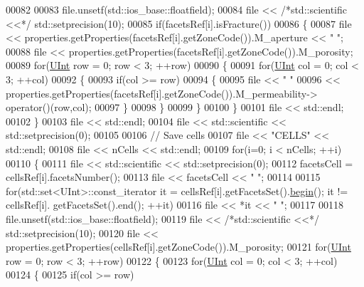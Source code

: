 \begin{DoxyCode}
00082 
00083         file.unsetf(std::ios\_base::floatfield);
00084         file << \textcolor{comment}{/*std::scientific <<*/} std::setprecision(10);
00085         \textcolor{keywordflow}{if}(facetsRef[i].isFracture())
00086         \{
00087             file << properties.getProperties(facetsRef[i].getZoneCode()).M\_aperture << \textcolor{stringliteral}{" "};
00088             file << properties.getProperties(facetsRef[i].getZoneCode()).M\_porosity;
00089             \textcolor{keywordflow}{for}(\hyperlink{namespaceFVCode3D_a4bf7e328c75d0fd504050d040ebe9eda}{UInt} row = 0; row < 3; ++row)
00090             \{
00091                 \textcolor{keywordflow}{for}(\hyperlink{namespaceFVCode3D_a4bf7e328c75d0fd504050d040ebe9eda}{UInt} col = 0; col < 3; ++col)
00092                 \{
00093                     \textcolor{keywordflow}{if}(col >= row)
00094                     \{
00095                         file << \textcolor{stringliteral}{" "}
00096                              << properties.getProperties(facetsRef[i].getZoneCode()).M\_permeability->
      operator()(row,col);
00097                     \}
00098                 \}
00099             \}
00100         \}
00101         file << std::endl;
00102     \}
00103     file << std::endl;
00104     file << std::scientific << std::setprecision(0);
00105 
00106     \textcolor{comment}{// Save cells}
00107     file << \textcolor{stringliteral}{"CELLS"} << std::endl;
00108     file << nCells << std::endl;
00109     \textcolor{keywordflow}{for}(i=0; i < nCells; ++i)
00110     \{
00111         file << std::scientific << std::setprecision(0);
00112         facetsCell = cellsRef[i].facetsNumber();
00113         file << facetsCell << \textcolor{stringliteral}{" "};
00114 
00115         \textcolor{keywordflow}{for}(std::set<UInt>::const\_iterator it = cellsRef[i].getFacetsSet().\hyperlink{namespacestd_acec9a198880c12f51f02be95a298a48b}{begin}(); it != cellsRef[i].
      getFacetsSet().end(); ++it)
00116             file << *it << \textcolor{stringliteral}{" "};
00117 
00118         file.unsetf(std::ios\_base::floatfield);
00119         file << \textcolor{comment}{/*std::scientific <<*/} std::setprecision(10);
00120         file << properties.getProperties(cellsRef[i].getZoneCode()).M\_porosity;
00121         \textcolor{keywordflow}{for}(\hyperlink{namespaceFVCode3D_a4bf7e328c75d0fd504050d040ebe9eda}{UInt} row = 0; row < 3; ++row)
00122         \{
00123             \textcolor{keywordflow}{for}(\hyperlink{namespaceFVCode3D_a4bf7e328c75d0fd504050d040ebe9eda}{UInt} col = 0; col < 3; ++col)
00124             \{
00125                 \textcolor{keywordflow}{if}(col >= row)

\end{DoxyCode}
